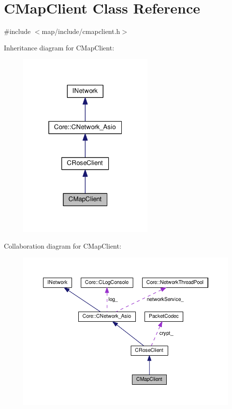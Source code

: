 \hypertarget{classCMapClient}{}\section{C\+Map\+Client Class Reference}
\label{classCMapClient}


{\ttfamily \#include $<$map/include/cmapclient.\+h$>$}



Inheritance diagram for C\+Map\+Client\+:
\nopagebreak
\begin{figure}[H]
\begin{center}
\leavevmode
\includegraphics[width=193pt]{classCMapClient__inherit__graph}
\end{center}
\end{figure}


Collaboration diagram for C\+Map\+Client\+:
\nopagebreak
\begin{figure}[H]
\begin{center}
\leavevmode
\includegraphics[width=350pt]{classCMapClient__coll__graph}
\end{center}
\end{figure}
